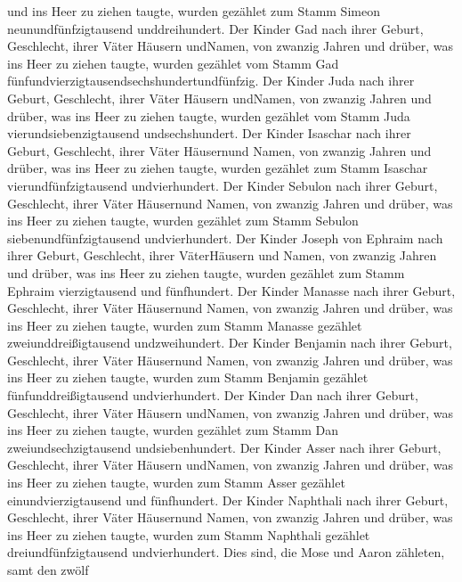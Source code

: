 und ins Heer zu ziehen taugte,  wurden gezählet zum Stamm
Simeon neunundfünfzigtausend unddreihundert.  Der Kinder
Gad nach ihrer Geburt, Geschlecht, ihrer Väter Häusern undNamen, von
zwanzig Jahren und drüber, was ins Heer zu ziehen taugte, 
wurden gezählet vom Stamm Gad
fünfundvierzigtausendsechshundertundfünfzig.  Der Kinder
Juda nach ihrer Geburt, Geschlecht, ihrer Väter Häusern undNamen, von
zwanzig Jahren und drüber, was ins Heer zu ziehen taugte, 
wurden gezählet vom Stamm Juda vierundsiebenzigtausend undsechshundert.
 Der Kinder Isaschar nach ihrer Geburt, Geschlecht, ihrer
Väter Häusernund Namen, von zwanzig Jahren und drüber, was ins Heer zu
ziehen taugte,  wurden gezählet zum Stamm Isaschar
vierundfünfzigtausend undvierhundert.  Der Kinder Sebulon
nach ihrer Geburt, Geschlecht, ihrer Väter Häusernund Namen, von zwanzig
Jahren und drüber, was ins Heer zu ziehen taugte,  wurden
gezählet zum Stamm Sebulon siebenundfünfzigtausend undvierhundert.
 Der Kinder Joseph von Ephraim nach ihrer Geburt,
Geschlecht, ihrer VäterHäusern und Namen, von zwanzig Jahren und drüber,
was ins Heer zu ziehen taugte,  wurden gezählet zum Stamm
Ephraim vierzigtausend und fünfhundert.  Der Kinder Manasse
nach ihrer Geburt, Geschlecht, ihrer Väter Häusernund Namen, von zwanzig
Jahren und drüber, was ins Heer zu ziehen taugte,  wurden
zum Stamm Manasse gezählet zweiunddreißigtausend undzweihundert.
 Der Kinder Benjamin nach ihrer Geburt, Geschlecht, ihrer
Väter Häusernund Namen, von zwanzig Jahren und drüber, was ins Heer zu
ziehen taugte,  wurden zum Stamm Benjamin gezählet
fünfunddreißigtausend undvierhundert.  Der Kinder Dan nach
ihrer Geburt, Geschlecht, ihrer Väter Häusern undNamen, von zwanzig
Jahren und drüber, was ins Heer zu ziehen taugte,  wurden
gezählet zum Stamm Dan zweiundsechzigtausend undsiebenhundert.
 Der Kinder Asser nach ihrer Geburt, Geschlecht, ihrer
Väter Häusern undNamen, von zwanzig Jahren und drüber, was ins Heer zu
ziehen taugte,  wurden zum Stamm Asser gezählet
einundvierzigtausend und fünfhundert.  Der Kinder Naphthali
nach ihrer Geburt, Geschlecht, ihrer Väter Häusernund Namen, von zwanzig
Jahren und drüber, was ins Heer zu ziehen taugte,  wurden
zum Stamm Naphthali gezählet dreiundfünfzigtausend undvierhundert.
 Dies sind, die Mose und Aaron zähleten, samt den zwölf
